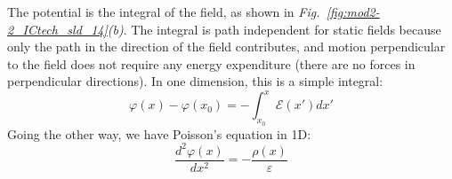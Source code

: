 The potential is the integral of the field, as shown in \emph{Fig.~\ref{fig:mod2-2_ICtech_sld_14}(b)}.  The integral is path independent for static fields because only the path in the direction of the field contributes, and motion perpendicular to the field does not require any energy expenditure (there are no forces in perpendicular directions).  In one dimension, this is a simple integral:
    \begin{equation} 
        \varphi (x) - \varphi ({x_0}) =  - \int_{{x_0}}^x {\mathcal{E}(x')dx'}  
    \end{equation}
Going the other way, we have Poisson’s equation in 1D:
    \begin{equation} 
        \frac{{{d^2}\varphi (x)}}{{d{x^2}}} =  - \frac{{\rho (x)}}{\varepsilon }
    \end{equation}
